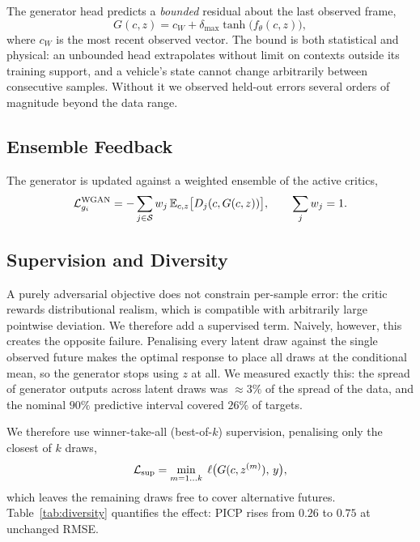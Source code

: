 \documentclass[journal]{IEEEtran}
\begin{document}
The generator head predicts a \emph{bounded} residual about the last observed
frame,
\begin{equation}
G(c,z) = c_{W} + \delta_{\max}\tanh\!\big(f_\theta(c,z)\big),
\label{eq:gen}
\end{equation}
where $c_W$ is the most recent observed vector. The bound is both statistical
and physical: an unbounded head extrapolates without limit on contexts outside
its training support, and a vehicle's state cannot change arbitrarily between
consecutive samples. Without it we observed held-out errors several orders of
magnitude beyond the data range.

\subsection{Ensemble Feedback}
The generator is updated against a weighted ensemble of the active critics,
\begin{equation}
\mathcal{L}^{\rm WGAN}_{g_i}
 = -\sum_{j\in\mathcal{S}} w_j\,\mathbb{E}_{c,z}\big[D_j(c,G(c,z))\big],
\qquad \sum_j w_j = 1 .
\label{eq:ensemble}
\end{equation}

\subsection{Supervision and Diversity}
\label{sec:diversity}
A purely adversarial objective does not constrain per-sample error: the critic
rewards distributional realism, which is compatible with arbitrarily large
pointwise deviation. We therefore add a supervised term. Naively, however, this
creates the opposite failure. Penalising every latent draw against the single
observed future makes the optimal response to place all draws at the conditional
mean, so the generator stops using $z$ at all. We measured exactly this: the
spread of generator outputs across latent draws was $\approx 3\%$ of the spread
of the data, and the nominal $90\%$ predictive interval covered $26\%$ of
targets.

We therefore use winner-take-all (best-of-$k$) supervision, penalising only the
closest of $k$ draws,
\begin{equation}
\mathcal{L}_{\rm sup} = \min_{m=1\ldots k}\;
  \ell\big(G(c,z^{(m)}),\,y\big),
\label{eq:bok}
\end{equation}
which leaves the remaining draws free to cover alternative futures.
Table~\ref{tab:diversity} quantifies the effect: PICP rises from $0.26$ to
$0.75$ at unchanged RMSE.
\end{document}
